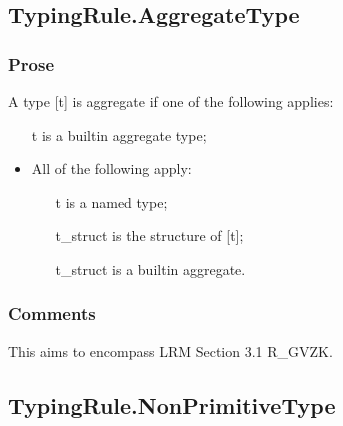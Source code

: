 \documentclass{book}
\begin{document}
\subsection{TypingRule.AggregateType}

    \subsubsection{Prose}
    A type [t] is aggregate if one of the following applies:
    \begin{itemize}
    \item  [t] is a builtin aggregate type;
    \item  All of the following apply:
      \begin{itemize}
      \item  [t] is a named type;
      \item  [t\_struct] is the structure of [t];
      \item  [t\_struct] is a builtin aggregate. 
      \end{itemize}
    \end{itemize}

    \subsubsection{Comments}
    This aims to encompass LRM Section 3.1 R\_GVZK.

\subsection{TypingRule.NonPrimitiveType}
\end{document}
